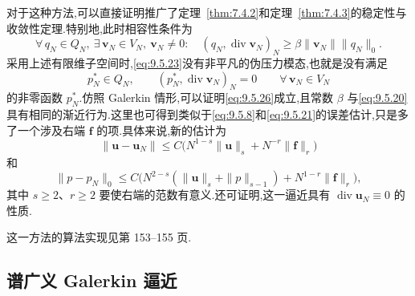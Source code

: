 对于这种方法,可以直接证明推广了定理~\ref{thm:7.4.2}和定理~\ref{thm:7.4.3}的稳定性与收敛性定理.特别地,此时相容性条件为
\begin{equation}\label{eq:9.5.26}
  \forall\,q_N\in Q_N,\ \exists\,\boldsymbol{v}_N\in V_N,\ \boldsymbol{v}_N\ne0:\quad
    (q_N,\operatorname{div}\boldsymbol{v}_N)_N
       \ge\beta\|\boldsymbol{v}_N\|\|q_N\|_0 .
\end{equation}
采用上述有限维子空间时,\eqref{eq:9.5.23}没有非平凡的伪压力模态,也就是没有满足
\begin{equation}\label{eq:9.5.27}
  p_N^*\in Q_N,\qquad (p_N^*,\operatorname{div}\boldsymbol{v}_N)_N=0
             \qquad\forall\,\boldsymbol{v}_N\in V_N
\end{equation}
的非零函数 \(p_N^*\).仿照 Galerkin 情形,可以证明\eqref{eq:9.5.26}成立,且常数 \(\beta\) 与\eqref{eq:9.5.20}具有相同的渐近行为.这里也可得到类似于\eqref{eq:9.5.8}和\eqref{eq:9.5.21}的误差估计,只是多了一个涉及右端 \(\boldsymbol{f}\) 的项.具体来说,新的估计为
\begin{equation}\label{eq:9.5.28}
  \|\boldsymbol{u}-\boldsymbol{u}_N\|
    \le C\bigl(N^{1-s}\|\boldsymbol{u}\|_s+N^{-r}\|\boldsymbol{f}\|_r\bigr)
\end{equation}
和
\begin{equation}\label{eq:9.5.29}
  \|p-p_N\|_0
    \le C\bigl(N^{2-s}(\|\boldsymbol{u}\|_s+\|p\|_{s-1})+N^{1-r}\|\boldsymbol{f}\|_r\bigr),
\end{equation}
其中 \(s\ge2\)、\(r\ge2\) 要使右端的范数有意义.还可证明,这一逼近具有 \(\operatorname{div}\boldsymbol{u}_N\equiv0\) 的性质.

这一方法的算法实现见第 153–155 页.

\subsection{谱广义 Galerkin 逼近}\label{sec:9.5.3}

